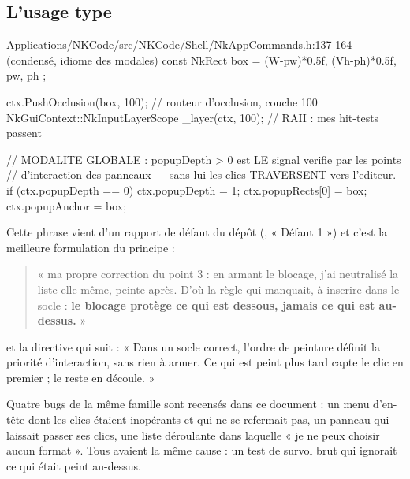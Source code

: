 \subsection{L'usage type}

\begin{nkcode}{Applications/NKCode/src/NKCode/Shell/NkAppCommands.h:137-164 (condensé, idiome des modales)}
const NkRect box = { (W-pw)*0.5f, (Vh-ph)*0.5f, pw, ph };

ctx.PushOcclusion(box, 100);                                  // routeur d'occlusion, couche 100
NkGuiContext::NkInputLayerScope _layer(ctx, 100);             // RAII : mes hit-tests passent

// MODALITE GLOBALE : popupDepth > 0 est LE signal verifie par les points
// d'interaction des panneaux — sans lui les clics TRAVERSENT vers l'editeur.
if (ctx.popupDepth == 0) ctx.popupDepth = 1;
ctx.popupRects[0]  = box;
ctx.popupAnchor    = box;
\end{nkcode}

\begin{nkpiege}
Cette phrase vient d'un rapport de défaut du dépôt
(, « Défaut 1 ») et c'est la meilleure
formulation du principe :

\begin{quote}
« ma propre correction du point 3 : en armant le blocage, j'ai neutralisé la
liste elle-même, peinte après. D'où la règle qui manquait, à inscrire dans le
socle : \textbf{le blocage protège ce qui est dessous, jamais ce qui est
au-dessus.} »
\end{quote}

et la directive qui suit : « Dans un socle correct, l'ordre de peinture définit
la priorité d'interaction, sans rien à armer. Ce qui est peint plus tard capte le
clic en premier ; le reste en découle. »

Quatre bugs de la même famille sont recensés dans ce document : un menu d'en-tête
dont les clics étaient inopérants et qui ne se refermait pas, un panneau qui
laissait passer ses clics, une liste déroulante dans laquelle « je ne peux
choisir aucun format ». Tous avaient la même cause : un test de survol brut qui
ignorait ce qui était peint au-dessus.
\end{nkpiege}

